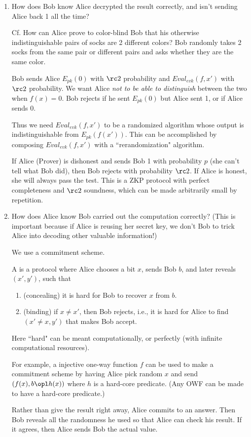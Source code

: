 \begin{enumerate}
\item
How does Bob know Alice decrypted the result correctly, and isn't sending Alice back 1 all the time?

Cf. How can Alice prove to color-blind Bob that his otherwise indistinguishable pairs of socks are 2 different colors? Bob randomly takes 2 socks from the same pair or different pairs and asks whether they are the same color.

Bob sends Alice $E_{pk}(0)$ with $\rc2$ probability and $Eval_{evk}(f,x')$ with $\rc 2$ probability. We want Alice {\it not to be able to distinguish} between the two when $f(x)=0$. Bob rejects if he sent $E_{pk}(0)$ but Alice sent 1, or if Alice sends 0. 

Thus we need $Eval_{evk}(f,x')$ to be a randomized algorithm whose output is indistinguishable from $E_{pk}(f(x'))$. This can be accomplished by composing $Eval_{evk}(f,x')$ with a ``rerandomization" algorithm. 

If Alice (Prover) is dishonest and sends Bob 1 with probability $p$ (she can't tell what Bob did), then Bob rejects with probability $\rc2$. If Alice is honest, she will always pass the test. This is a ZKP protocol with perfect completeness and $\rc2$ soundness, which can be made arbitrarily small by repetition.
\item 
How does Alice know Bob carried out the computation correctly? (This is important because if Alice is reusing her secret key, we don't Bob to trick Alice into decoding other valuable information!)

We use a commitment scheme. 
\begin{df}
A  is a protocol where Alice chooses a bit $x$, sends Bob $b$, and later reveals $(x',y')$, such that 
\begin{enumerate}
\item (concealing) it is hard for Bob to recover $x$ from $b$.
\item (binding) if $x\ne x'$, then Bob rejects, i.e., it is hard for Alice to find $(x'\ne x,y')$ that makes Bob accept.
\end{enumerate}
Here ``hard" can be meant computationally, or perfectly (with infinite computational resources).
\end{df}
For example, a injective one-way function $f$ can be used to make a commitment scheme by having Alice pick random $x$ and send $(f(x),b\opl h(x))$ where $h$ is a hard-core predicate. (Any OWF can be made to have a hard-core predicate.)

Rather than give the result right away, Alice commits to an answer. Then Bob reveals all the randomness he used so that Alice can check his result. If it agrees, then Alice sends Bob the actual value.
\end{enumerate}

